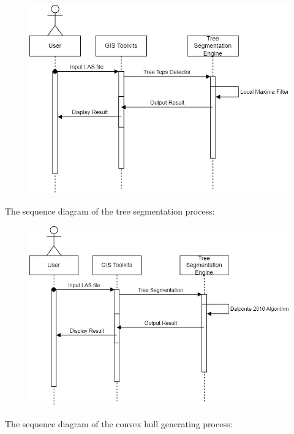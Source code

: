 \documentclass[a4paper, 12pt]{article}
\begin{document}
\begin{figure}[H]
    \centering
    \includegraphics[scale=0.4]{Images/sequenceDiagram-Tree Tops Detector.jpg}
\end{figure}
\newpage
The sequence diagram of the tree segmentation process:

\begin{figure}[H]
    \centering
    \includegraphics[scale=0.4]{Images/sequenceDiagram-Tree Segmentation.jpg}
\end{figure}

The sequence diagram of the convex hull generating process:
\end{document}
